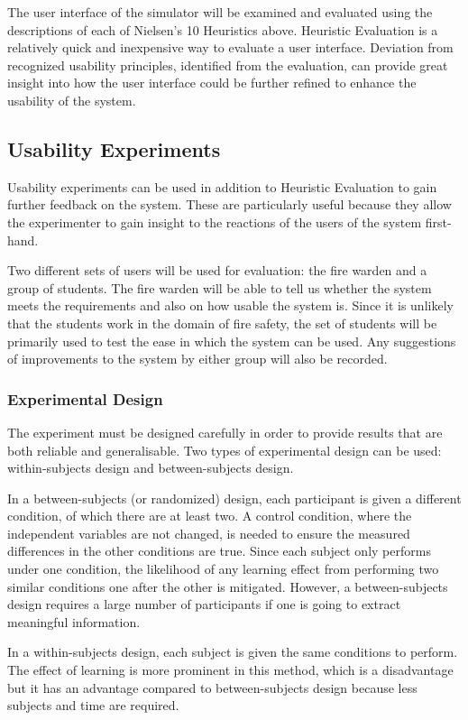 The user interface of the simulator will be examined and evaluated using the descriptions of each of Nielsen’s 10 Heuristics above. Heuristic Evaluation is a relatively quick and inexpensive way to evaluate a user interface. Deviation from recognized usability principles, identified from the evaluation, can provide great insight into how the user interface could be further refined to enhance the usability of the system.

\subsection{Usability Experiments}
Usability experiments can be used in addition to Heuristic Evaluation to gain further feedback on the system. These are particularly useful because they allow the experimenter to gain insight to the reactions of the users of the system first-hand.

Two different sets of users will be used for evaluation: the fire warden and a group of students. The fire warden will be able to tell us whether the system meets the requirements and also on how usable the system is. Since it is unlikely that the students work in the domain of fire safety, the set of students will be primarily used to test the ease in which the system can be used. Any suggestions of improvements to the system by either group will also be recorded.

\subsubsection{Experimental Design}
The experiment must be designed carefully in order to provide results that are both reliable and generalisable. Two types of experimental design can be used: within-subjects design and between-subjects design.

In a between-subjects (or randomized) design, each participant is given a different condition, of which there are at least two. A control condition, where the independent variables are not changed, is needed to ensure the measured differences in the other conditions are true. Since each subject only performs under one condition, the likelihood of any learning effect from performing two similar conditions one after the other is mitigated. However, a between-subjects design requires a large number of participants if one is going to extract meaningful information.

In a within-subjects design, each subject is given the same conditions to perform. The effect of learning is more prominent in this method, which is a disadvantage but it has an advantage compared to between-subjects design because less subjects and time are required.

